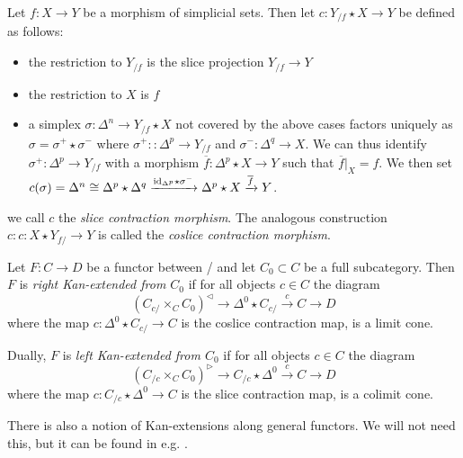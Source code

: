 \begin{construction}%
    Let $f\colon X\to Y$ be a morphism of simplicial sets.
    Then let $c\colon Y_{/f}\star X\to Y$ be defined as follows:
    \begin{itemize}
        \item the restriction to $Y_{/f}$ is the slice projection $Y_{/f}\to Y$
        \item the restriction to $X$ is $f$
        \item a simplex $\sigma\colon\Delta^n\to Y_{/f}\star X$ not covered by the above cases factors uniquely as $\sigma=\sigma^+\star\sigma^-$ where $\sigma^+\colon\colon\Delta^p\to Y_{/f}$ and $\sigma^-\colon\Delta^q\to X$.
              We can thus identify $\sigma^+\colon\Delta^p\to Y_{/f}$ with a morphism $\overline{f}\colon\Delta^p\star X\to Y$ such that $\overline{f}|_{X}=f$.
              We then set $c(\sigma)=\Delta^n\cong\Delta^p\star\Delta^q\xrightarrow{\text{id}_{\Delta^p}\star\sigma^-}\Delta^p\star X\xrightarrow{\overline{f}} Y$.
    \end{itemize}
    we call $c$ the \emph{slice contraction morphism}.
    The analogous construction $c\colon c\colon X\star Y_{f/}\to Y$ is called the \emph{coslice contraction morphism}.
\end{construction}
\begin{definition} %
    Let $F\colon C\to D$ be a functor between \inftycats/ and let $C_0\subset C$ be a full subcategory.
    Then $F$ is \emph{right Kan-extended from $C_0$} if for all objects $c\in C$ the diagram
    \begin{equation*}
        \left(C_{c/}\times_C C_0\right)^{\lhd}\to \Delta^0\star C_{c/}\xrightarrow{c} C\to D
    \end{equation*}
    where the map $c\colon\Delta^0\star C_{c/}\to C$ is the coslice contraction map, is a limit cone.

    Dually, $F$ is \emph{left Kan-extended from $C_0$} if for all objects $c\in C$ the diagram
    \begin{equation*}
        \left(C_{/c}\times_C C_0\right)^{\rhd}\to C_{/c}\star\Delta^0 \xrightarrow{c} C\to D
    \end{equation*}
    where the map $c\colon C_{/c}\star\Delta^0\to C$ is the slice contraction map, is a colimit cone.
\end{definition}
\begin{remark}
    There is also a notion of Kan-extensions along general functors. 
    We will not need this, but it can be found in e.g. \cite[\S 7.3.1]{kerodon}.
\end{remark}
